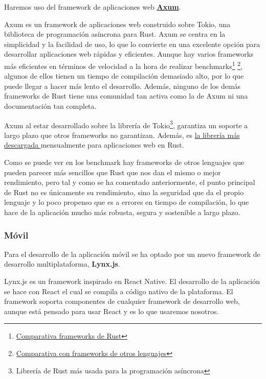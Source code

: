 Haremos uso del framework de aplicaciones web \href{https://github.com/tokio-rs/axum?tab=readme-ov-file}{\textbf{Axum}}.

Axum es un framework de aplicaciones web construido sobre Tokio, una biblioteca de programación asíncrona para Rust. Axum se centra en la simplicidad y la facilidad de uso, lo que lo convierte en una excelente opción para desarrollar aplicaciones web rápidas y eficientes.
Aunque hay varios frameworks más eficientes en términos de velocidad a la hora de realizar benchmarks\footnote{\href{https://web-frameworks-benchmark.netlify.app/result?l=rust}{Comparativa frameworks de Rust}} \footnote{\href{https://www.techempower.com/benchmarks/\#section=data-r21&test=composite&hw=ph}{Comparativa con frameworks de otros lenguajes}}, algunos de ellos tienen un tiempo de compilación demasiado alto, por lo que puede llegar a hacer más lento el desarrollo.
Además, ninguno de los demás frameworks de Rust tiene una comunidad tan activa como la de Axum ni una documentación tan completa.

Axum al estar desarrollado sobre la librería de Tokio\footnote{Librería de Rust más usada para la programación asíncrona}, garantiza un soporte a largo plazo que otros frameworks no garantizan. Además, es \href{https://lib.rs/crates/axum}{la librería más descargada }mensualmente para aplicaciones web en Rust.

Como se puede ver en los benchmark hay frameworks de otros lenguajes que pueden parecer más sencillos que Rust que nos dan el mismo o mejor rendimiento, pero tal y como se ha comentado anteriormente, el punto principal de Rust no es únicamente su rendimiento, sino la seguridad que da el propio lenguaje y lo poco propenso que es a errores en tiempo de compilación, lo que hace de la aplicación mucho más robusta, segura y sostenible a largo plazo.


\subsubsection{Móvil}
Para el desarrollo de la aplicación móvil se ha optado por un nuevo framework de desarrollo multiplataforma, \textbf{Lynx.js}.

Lynx.js es un framework inspirado en React Native. El desarrollo de la aplicación se hace con React el cual se compila a código nativo de la plataforma. El framework soporta componentes de cualquier framework de desarrollo web, aunque está pensado para usar React y es lo que usaremos nosotros.


